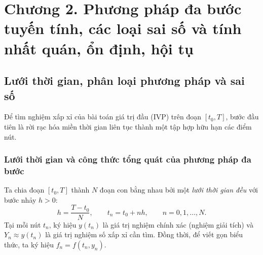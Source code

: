 \section{Chương 2. Phương pháp đa bước tuyến tính, các loại sai số và tính nhất quán, ổn định, hội tụ}

\subsection{Lưới thời gian, phân loại phương pháp và sai số}

Để tìm nghiệm xấp xỉ của bài toán giá trị đầu (IVP) trên đoạn $[t_0, T]$, bước đầu tiên là rời rạc hóa miền thời gian liên tục thành một tập hợp hữu hạn các điểm nút.
\subsubsection{Lưới thời gian và công thức tổng quát của phương pháp đa bước}
Ta chia đoạn $[t_0, T]$ thành $N$ đoạn con bằng nhau bởi một \textit{lưới thời gian đều} với bước nhảy $h > 0$:
\begin{equation}
    h = \frac{T - t_0}{N}, \qquad t_n = t_0 + nh, \qquad n = 0, 1, \dots, N. \tag{2.1} \label{eq:2.1}
\end{equation}
\noindent Tại mỗi nút $t_n$, ký hiệu $y(t_n)$ là giá trị nghiệm chính xác (nghiệm giải tích) và $Y_n \approx y(t_n)$ là giá trị nghiệm số xấp xỉ cần tìm. Đồng thời, để viết gọn biểu thức, ta ký hiệu $f_n = f(t_n, y_n)$. 







